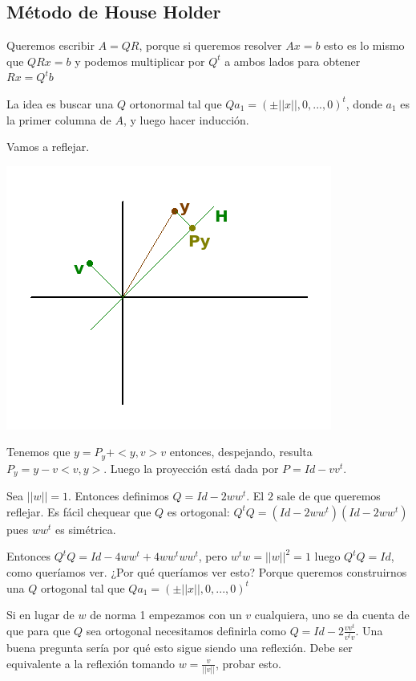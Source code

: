 \documentclass[10pt,a4paper,final]{report}
\begin{document}


\subsection{Método de House Holder}

Queremos escribir $A=QR$, porque si queremos resolver $Ax = b$ esto es lo mismo que $QRx = b$ y podemos multiplicar por $Q^t$ a ambos lados para obtener $Rx = Q^t b$

La idea es buscar una $Q$ ortonormal tal que $Qa_1 = (\pm ||x||,0,...,0)^t$, donde $a_1$ es la primer columna de $A$, y luego hacer inducción.

Vamos a reflejar.

\includegraphics[scale=1]{householder1.png}

Tenemos que $y=P_y + <y,v> v$ entonces, despejando, resulta $P_y = y-v<v,y>$. Luego la proyección está dada por $P=Id-vv^t$.

Sea $||w||=1$. Entonces definimos $Q=Id-2ww^t$. El $2$ sale de que queremos reflejar. Es fácil chequear que $Q$ es ortogonal: $Q^t Q = (Id - 2 w w^t) (Id - 2 w w^t)$ pues $w w^t$ es simétrica.

Entonces $Q^t Q = Id - 4 w w^t + 4 w w^t w w^t$, pero $w^t w=||w||^2 = 1$ luego $Q^t Q = Id$, como queríamos ver. ¿Por qué queríamos ver esto? Porque queremos construirnos una $Q$ ortogonal tal que $Qa_1 = (\pm ||x||,0,...,0)^t$

Si en lugar de $w$ de norma 1 empezamos con un $v$ cualquiera, uno se da cuenta de que para que $Q$ sea ortogonal necesitamos definirla como $Q = Id - 2 \frac{v v^t}{v^t v}$. Una buena pregunta sería por qué esto sigue siendo una reflexión. Debe ser equivalente a la reflexión tomando $w=\frac{v}{||v||}$, probar esto.
\end{document}
